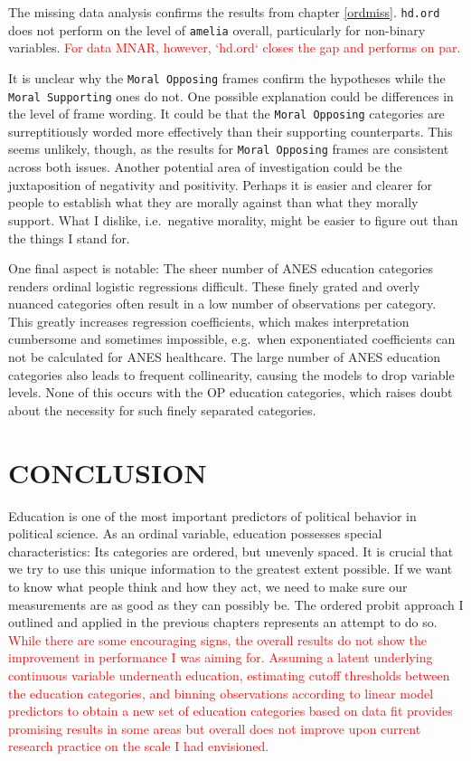 \documentclass[12pt,econ]{sources/authesis}
\begin{document}
The missing data analysis confirms the results from chapter \ref{ordmiss}. \texttt{hd.ord} does not perform on the level of \texttt{amelia} overall, particularly for non-binary variables. \textcolor{red}{For data MNAR, however, `hd.ord` closes the gap and performs on par.}

It is unclear why the \texttt{Moral\ Opposing} frames confirm the hypotheses while the \texttt{Moral\ Supporting} ones do not. One possible explanation could be differences in the level of frame wording. It could be that the \texttt{Moral\ Opposing} categories are surreptitiously worded more effectively than their supporting counterparts. This seems unlikely, though, as the results for \texttt{Moral\ Opposing} frames are consistent across both issues. Another potential area of investigation could be the juxtaposition of negativity and positivity. Perhaps it is easier and clearer for people to establish what they are morally against than what they morally support. What I dislike, i.e.~negative morality, might be easier to figure out than the things I stand for.

One final aspect is notable: The sheer number of ANES education categories renders ordinal logistic regressions difficult. These finely grated and overly nuanced categories often result in a low number of observations per category. This greatly increases regression coefficients, which makes interpretation cumbersome and sometimes impossible, e.g.~when exponentiated coefficients can not be calculated for ANES healthcare. The large number of ANES education categories also leads to frequent collinearity, causing the models to drop variable levels. None of this occurs with the OP education categories, which raises doubt about the necessity for such finely separated categories.

\hypertarget{conclusion}{%
\chapter{CONCLUSION}\label{conclusion}}

Education is one of the most important predictors of political behavior in political science. As an ordinal variable, education possesses special characteristics: Its categories are ordered, but unevenly spaced. It is crucial that we try to use this unique information to the greatest extent possible. If we want to know what people think and how they act, we need to make sure our measurements are as good as they can possibly be. The ordered probit approach I outlined and applied in the previous chapters represents an attempt to do so. \textcolor{red}{While there are some encouraging signs, the overall results do not show the improvement in performance I was aiming for. Assuming a latent underlying continuous variable underneath education, estimating cutoff thresholds between the education categories, and binning observations according to linear model predictors to obtain a new set of education categories based on data fit provides promising results in some areas but overall does not improve upon current research practice on the scale I had envisioned.}
\end{document}
